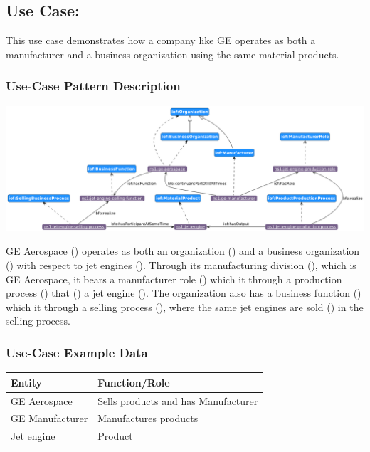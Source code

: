 \subsection*{Use Case: }

This use case demonstrates how a company like GE operates as both a manufacturer and a business organization using the same material products.

\subsubsection*{Use-Case Pattern Description}
\includegraphics[scale=0.35]{scenarios/different-type-organizations/image/different-type-organizations}

GE Aerospace () operates as both an organization () and a business organization () with respect to jet engines (). Through its manufacturing division (), which is  GE Aerospace, it bears a manufacturer role () which it  through a production process () that () a jet engine (). The organization also has a business function () which it  through a selling process (), where the same jet engines are sold () in the selling process.
\subsubsection*{Use-Case Example Data}


\begin{table}[h]
\label{tab:organization-structure}
\begin{tabular}{|l|l|}
\hline
Entity & Function/Role \\ \hline
GE Aerospace & Sells products and has Manufacturer \\
GE Manufacturer & Manufactures products \\
Jet engine & Product \\
\hline
\end{tabular}%
\end{table}


